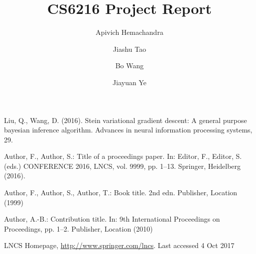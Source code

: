 \documentclass[runningheads]{llncs}
\begin{document}
%
\title{CS6216 Project Report}
%
%
\author{Apivich Hemachandra \and
Jiashu Tao \and
Bo Wang   \and
Jiayuan Ye }
%
%
%
\maketitle              %
%





%
%
%
% 
% 
%
\begin{thebibliography}{8}
Liu, Q., Wang, D. (2016). Stein variational gradient descent: A general purpose bayesian inference algorithm. Advances in neural information processing systems, 29.

Author, F., Author, S.: Title of a proceedings paper. In: Editor,
F., Editor, S. (eds.) CONFERENCE 2016, LNCS, vol. 9999, pp. 1--13.
Springer, Heidelberg (2016). 

Author, F., Author, S., Author, T.: Book title. 2nd edn. Publisher,
Location (1999)

Author, A.-B.: Contribution title. In: 9th International Proceedings
on Proceedings, pp. 1--2. Publisher, Location (2010)

LNCS Homepage, \url{http://www.springer.com/lncs}. Last accessed 4
Oct 2017
\end{thebibliography}
\end{document}
